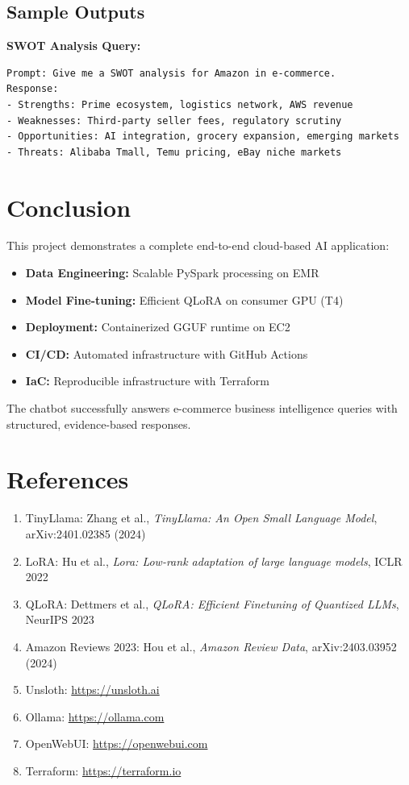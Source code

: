\documentclass[12pt,a4paper]{article}
\begin{document}
\subsection{Sample Outputs}

\textbf{SWOT Analysis Query:}
\begin{verbatim}
Prompt: Give me a SWOT analysis for Amazon in e-commerce.
Response:
- Strengths: Prime ecosystem, logistics network, AWS revenue
- Weaknesses: Third-party seller fees, regulatory scrutiny
- Opportunities: AI integration, grocery expansion, emerging markets
- Threats: Alibaba Tmall, Temu pricing, eBay niche markets
\end{verbatim}

\section{Conclusion}
\label{sec:conclusion}

This project demonstrates a complete end-to-end cloud-based AI application:

\begin{itemize}
    \item \textbf{Data Engineering:} Scalable PySpark processing on EMR
    \item \textbf{Model Fine-tuning:} Efficient QLoRA on consumer GPU (T4)
    \item \textbf{Deployment:} Containerized GGUF runtime on EC2
    \item \textbf{CI/CD:} Automated infrastructure with GitHub Actions
    \item \textbf{IaC:} Reproducible infrastructure with Terraform
\end{itemize}

The chatbot successfully answers e-commerce business intelligence queries with structured, evidence-based responses.

\section{References}

\begin{enumerate}
    \item TinyLlama: Zhang et al., \textit{TinyLlama: An Open Small Language Model}, arXiv:2401.02385 (2024)
    \item LoRA: Hu et al., \textit{Lora: Low-rank adaptation of large language models}, ICLR 2022
    \item QLoRA: Dettmers et al., \textit{QLoRA: Efficient Finetuning of Quantized LLMs}, NeurIPS 2023
    \item Amazon Reviews 2023: Hou et al., \textit{Amazon Review Data}, arXiv:2403.03952 (2024)
    \item Unsloth: \url{https://unsloth.ai}
    \item Ollama: \url{https://ollama.com}
    \item OpenWebUI: \url{https://openwebui.com}
    \item Terraform: \url{https://terraform.io}
\end{enumerate}
\end{document}
